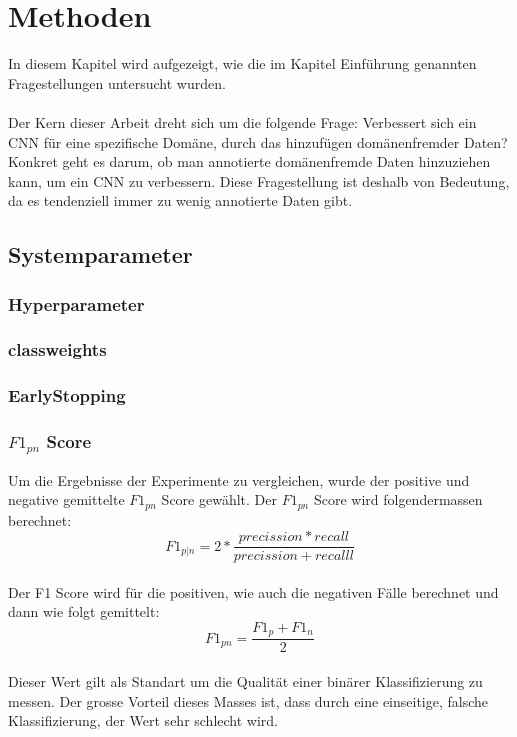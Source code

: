 \chapter{Methoden}
\label{methods}
In diesem Kapitel wird aufgezeigt, wie die im Kapitel Einführung genannten Fragestellungen untersucht wurden.\\\\
Der Kern dieser Arbeit dreht sich um die folgende Frage: Verbessert sich ein CNN für eine spezifische Domäne, durch das hinzufügen domänenfremder Daten?
Konkret geht es darum, ob man annotierte domänenfremde Daten hinzuziehen kann, um ein CNN zu verbessern. Diese Fragestellung ist deshalb von Bedeutung, da es tendenziell immer zu wenig annotierte Daten gibt.
\section{Systemparameter}
\subsection{Hyperparameter}
\subsection{classweights}
\subsection{EarlyStopping}
\subsection{$F1_{pn}$ Score}
Um die Ergebnisse der Experimente zu vergleichen, wurde der positive und negative gemittelte $F1_{pn}$ Score gewählt. 
Der $F1_{pn}$ Score wird folgendermassen berechnet:\\
\begin{equation}
F1_{p|n} = 2*\frac{precission*recall}{precission+recalll}
\end{equation}\\
Der F1 Score wird für die positiven, wie auch die negativen Fälle berechnet und dann wie folgt gemittelt:\\
\begin{equation}
F1_{pn} = \frac{F1_p+F1_n}{2}
\end{equation}\\
Dieser Wert gilt als Standart um die Qualität einer binärer Klassifizierung zu messen. Der grosse Vorteil dieses Masses ist, dass durch eine einseitige, falsche Klassifizierung, der Wert sehr schlecht wird.

